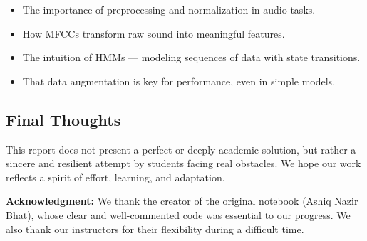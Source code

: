 \documentclass[11pt]{article}
\begin{document}
\begin{itemize}
    \item The importance of preprocessing and normalization in audio tasks.
    \item How MFCCs transform raw sound into meaningful features.
    \item The intuition of HMMs — modeling sequences of data with state transitions.
    \item That data augmentation is key for performance, even in simple models.
\end{itemize}

\subsection*{Final Thoughts}

This report does not present a perfect or deeply academic solution, but rather a sincere and resilient attempt by students facing real obstacles. We hope our work reflects a spirit of effort, learning, and adaptation.

\vspace{1em}

\noindent\textbf{Acknowledgment:} We thank the creator of the original notebook (Ashiq Nazir Bhat), whose clear and well-commented code was essential to our progress. We also thank our instructors for their flexibility during a difficult time.
\end{document}

